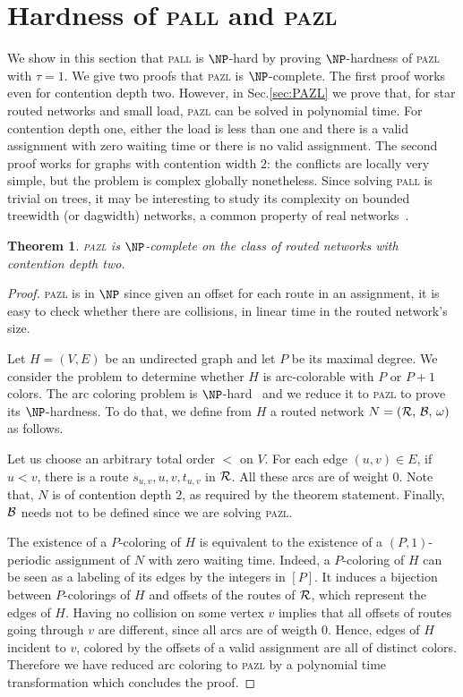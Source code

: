 \documentclass[a4paper,10pt]{article}
\newtheorem{theorem}{Theorem}
\newcommand\pazl{\textsc{pazl}\xspace}
\newcommand\pall{\textsc{pall}\xspace}
\begin{document}
\section{Hardness of \pall and \pazl}
  \label{sec:complexity}


	We show in this section that \pall is $\NP$-hard by proving $\NP$-hardness of \pazl with $\tau =1$. 
	We give two proofs that \pazl is $\NP$-complete.
	The first proof works even for contention depth two. However, in Sec.\ref{sec:PAZL} we prove
  	that, for star routed networks and small load, \pazl can be solved in polynomial time.
	 For contention depth one, either the load is less than one and there is a valid assignment with zero waiting time or there is no valid assignment. The second proof works for graphs with contention width $2$: the conflicts are locally very simple, but the problem is complex globally nonetheless. Since solving \pall is trivial on trees, it may be interesting to study its complexity on bounded treewidth (or dagwidth) networks, a common property of real networks~\cite{de2011treewidth}.
 

 \begin{theorem}
\pazl is $\NP$-complete on the class of routed networks with contention depth two.
\end{theorem}
 \begin{proof}
 \pazl is in $\NP$ since given an offset for each route in an assignment, it is easy to check whether there are collisions, in linear time in the routed network's size.
 
  Let $H=(V,E)$ be an undirected graph and let $P$ be its maximal degree. We consider the problem to determine whether $H$ is arc-colorable with $P$ or $P+1$ colors. The arc coloring problem is $\NP$-hard~\cite{holyer1981np} and we reduce it to \pazl to prove its $\NP$-hardness. To do that, we define from $H$ a routed network $N = ({\cal R},\, {\cal B},\, \omega)$ as follows. 

  Let us choose an arbitrary total order $<$ on $V$.
  For each edge $(u,v) \in E$, if $u<v$, there is a route $s_{u,v},u,v,t_{u,v}$ in ${\cal R}$. 
  All these arcs are of weight $0$. Note that, $N$ is of contention depth $2$, as required by the theorem statement. Finally, $ {\cal B}$ needs not to be defined since we are solving \pazl.
   
  The existence of a $P$-coloring of $H$ is equivalent to the existence of a $(P,1)$-periodic assignment of $N$ with zero waiting time. Indeed, a $P$-coloring of $H$ can be seen as a labeling of its edges by the integers in $[P]$. It induces a bijection between $P$-colorings of $H$ and offsets of the routes of ${\cal R}$, which represent the edges of $H$. Having no collision on some vertex $v$ implies that all offsets of routes going through $v$ are different, since all arcs are of weigth $0$. Hence, edges of $H$ incident to $v$, colored by the offsets of a valid assignment are all of distinct colors. Therefore we have reduced arc coloring to \pazl by a polynomial time transformation which concludes the proof. 
 \end{proof}
 
\end{document}
